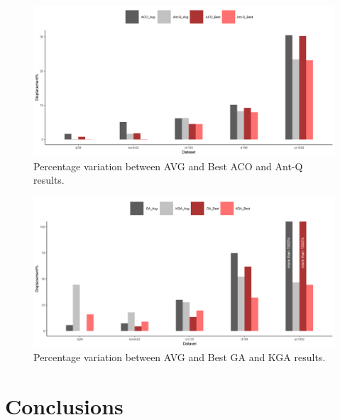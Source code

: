 \documentclass[10pt]{article}
\begin{document}
\begin{figure}
\centering \includegraphics[scale=0.5]{figs/ACO_Ant-Q_avg_best.png}
\caption{\label{fig:aco-comparison} Percentage variation between AVG and Best ACO and Ant-Q results.}
\end{figure}

\begin{figure}
\centering \includegraphics[scale=0.5]{figs/GA_KGA_avg_best.png}
\caption{\label{fig:GA_KGA_performance} Percentage variation between AVG and Best GA and KGA results.}
\end{figure}

\section{Conclusions}
\end{document}

